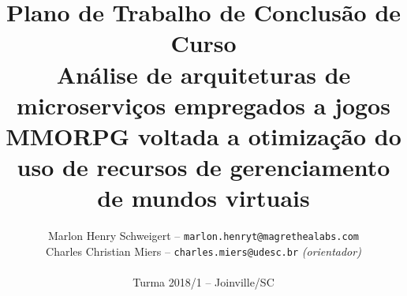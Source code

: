 \documentclass[11pt]{article}
\begin{document}
\pagestyle{fancy}

\title{
Plano de Trabalho de Conclusão de Curso\\
Análise de arquiteturas de microserviços empregados a jogos MMORPG voltada a otimização do uso de recursos de gerenciamento de mundos virtuais
}

\author{
Marlon Henry Schweigert -- \texttt{marlon.henryt@magrethealabs.com}\\
Charles Christian Miers -- \texttt{charles.miers@udesc.br} {\it (orientador)}\\
~\\
Turma 2018/1 -- Joinville/SC
}
\end{document}

